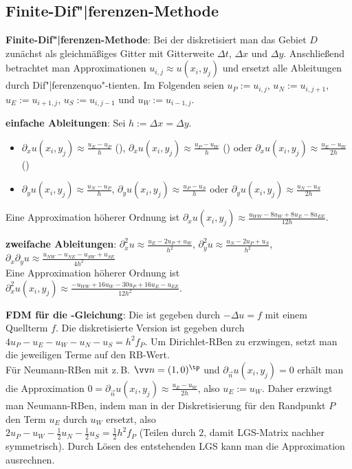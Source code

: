 \pagebreak

\subsection{%
    Finite-Dif"|ferenzen-Methode%
}

\textbf{Finite-Dif"|ferenzen-Methode}:
Bei der  diskretisiert man das Gebiet $D$ zunächst
als gleichmäßiges Gitter mit Gitterweite $\Delta t$, $\Delta x$ und $\Delta y$.
Anschließend betrachtet man Approximationen $u_{i,j} \approx u(x_i, y_j)$
und ersetzt alle Ableitungen durch Dif"|ferenzenquo"-tienten.
Im Folgenden seien
$u_P := u_{i,j}$,
$u_N := u_{i,j+1}$,
$u_E := u_{i+1,j}$,
$u_S := u_{i,j-1}$ und
$u_W := u_{i-1,j}$.

\textbf{einfache Ableitungen}:
Sei $h := \Delta x = \Delta y$.
\begin{itemize}
    \item
    $\partial_x u(x_i, y_j) \approx \frac{u_E - u_P}{h}$ (),
    $\partial_x u(x_i, y_j) \approx \frac{u_P - u_W}{h}$ () oder
    $\partial_x u(x_i, y_j) \approx \frac{u_E - u_W}{2h}$ ()

    \item
    $\partial_y u(x_i, y_j) \approx \frac{u_N - u_P}{h}$,
    $\partial_y u(x_i, y_j) \approx \frac{u_P - u_S}{h}$ oder
    $\partial_y u(x_i, y_j) \approx \frac{u_N - u_S}{2h}$
\end{itemize}
Eine Approximation höherer Ordnung ist
$\partial_x u(x_i, y_j) \approx \frac{u_{WW} - 8u_W + 8u_E - 8u_{EE}}{12h}$.

\textbf{zweifache Ableitungen}:
$\partial_x^2 u \approx \frac{u_E - 2u_P + u_W}{h^2}$,
$\partial_y^2 u \approx \frac{u_N - 2u_P + u_S}{h^2}$,
$\partial_x \partial_y u \approx \frac{u_{NW} - u_{NE} - u_{SW} + u_{SE}}{4h^2}$\\
Eine Approximation höherer Ordnung ist
$\partial_x^2 u(x_i, y_j) \approx \frac{-u_{WW} + 16u_W - 30u_P + 16u_E - u_{EE}}{12h^2}$.

\linie

\textbf{FDM für die -Gleichung}:
Die  ist gegeben durch $-\Delta u = f$ mit einem Quellterm $f$.
Die diskretisierte Version ist gegeben durch
$4u_P - u_E - u_W - u_N - u_S = h^2 f_P$.
Um Dirichlet-RBen zu erzwingen, setzt man die jeweiligen Terme auf den RB-Wert.\\
Für Neumann-RBen mit z.\,B. $\vec{n} = (1, 0)^\tp$ und $\partial_{\vec{n}} u(x_i, y_j) = 0$
erhält man die Approximation $0 = \partial_{\vec{n}} u(x_i, y_j) \approx \frac{u_E - u_W}{2h}$,
also $u_E := u_W$.
Daher erzwingt man Neumann-RBen, indem man in der Diskretisierung für den Randpunkt $P$
den Term $u_E$ durch $u_W$ ersetzt, also\\
$2u_P - u_W - \frac{1}{2} u_N - \frac{1}{2} u_S = \frac{1}{2} h^2 f_P$
(Teilen durch $2$, damit LGS-Matrix nachher symmetrisch).
Durch Lösen des entstehenden LGS kann man die Approximation ausrechnen.

